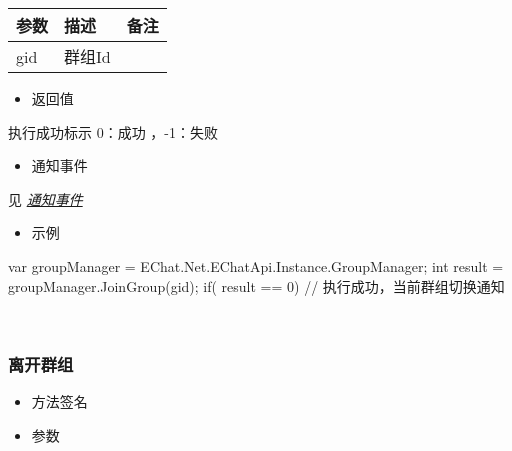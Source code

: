 \documentclass[letterpaper,10pt,english]{sphinxmanual}
\begin{document}
\begin{savenotes}\sphinxattablestart
\centering
\begin{tabulary}{\linewidth}[t]{|T|T|T|}
\hline
\sphinxstyletheadfamily 
参数
&\sphinxstyletheadfamily 
描述
&\sphinxstyletheadfamily 
备注
\\
\hline
gid
&
群组Id
&\\
\hline
\end{tabulary}
\par
\sphinxattableend\end{savenotes}
\begin{itemize}
\item {} 
返回值

\end{itemize}

执行成功标示 0：成功 ，-1：失败
\begin{itemize}
\item {} 
通知事件

\end{itemize}

见 {\hyperref[\detokenize{csharp:groupEvent}]{\emph{通知事件}}}
\begin{itemize}
\item {} 
示例

\end{itemize}

%
\begin{sphinxVerbatim}[commandchars=\\\{\}]
var groupManager = EChat.Net.EChatApi.Instance.GroupManager;
int result = groupManager.JoinGroup(gid);
if( result == 0)\PYGZob{}
  // 执行成功，当前群组切换通知
\PYGZcb{}
\end{sphinxVerbatim}

​


\subsubsection{离开群组}
\label{\detokenize{csharp:id36}}\begin{itemize}
\item {} 
方法签名

\end{itemize}

%
\begin{sphinxVerbatim}[commandchars=\\\{\}]
  
\end{sphinxVerbatim}
\begin{itemize}
\item {} 
参数

\end{itemize}
\end{document}
